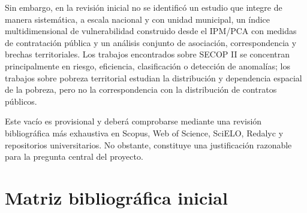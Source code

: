 \documentclass[11pt,letterpaper]{article}
\begin{document}
Sin embargo, en la revisión inicial no se identificó un estudio que integre de
manera sistemática, a escala nacional y con unidad municipal, un índice
multidimensional de vulnerabilidad construido desde el IPM/PCA con medidas de
contratación pública y un análisis conjunto de asociación, correspondencia y
brechas territoriales. Los trabajos encontrados sobre SECOP II se concentran
principalmente en riesgo, eficiencia, clasificación o detección de anomalías;
los trabajos sobre pobreza territorial estudian la distribución y dependencia
espacial de la pobreza, pero no la correspondencia con la distribución de
contratos públicos.

Este vacío es provisional y deberá comprobarse mediante una revisión
bibliográfica más exhaustiva en Scopus, Web of Science, SciELO, Redalyc y
repositorios universitarios. No obstante, constituye una justificación
razonable para la pregunta central del proyecto.

\section{Matriz bibliográfica inicial}
\end{document}
